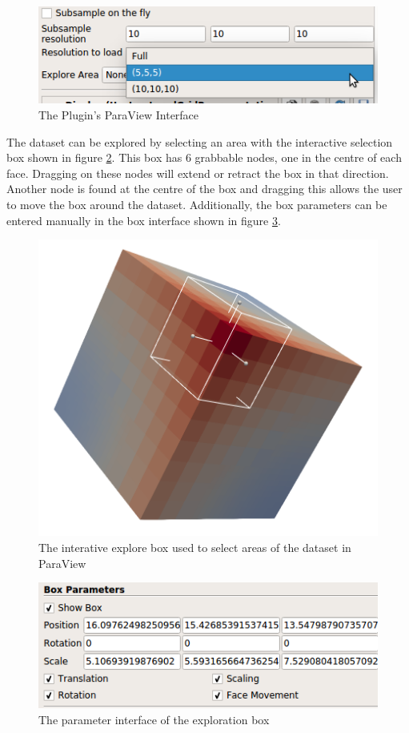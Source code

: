 \documentclass[12pt,a4paper]{article}
\begin{document}
\begin{figure}[h]
\centering
\includegraphics[scale=0.6]{paraview-interface-small}
\caption{The Plugin's ParaView Interface}
\label{ParaView-interface}
\end{figure}

The dataset can be explored by selecting an area with the interactive selection box shown in figure \ref{interactive-box}. This box has 6 grabbable nodes, one in the centre of each face. Dragging on these nodes will extend or retract the box in that direction. Another node is found at the centre of the box and dragging this allows the user to move the box around the dataset. Additionally, the box parameters can be entered manually in the box interface shown in figure \ref{box-manual}.

\begin{figure}[h]
\centering
\includegraphics[scale=0.3]{area-select-2}
\caption{The interative explore box used to select areas of the dataset in ParaView}
\label{interactive-box}
\end{figure}

\begin{figure}[h]
\centering
\includegraphics[scale=0.6]{box-params}
\caption{The parameter interface of the exploration box}
\label{box-manual}
\end{figure}
\end{document}
